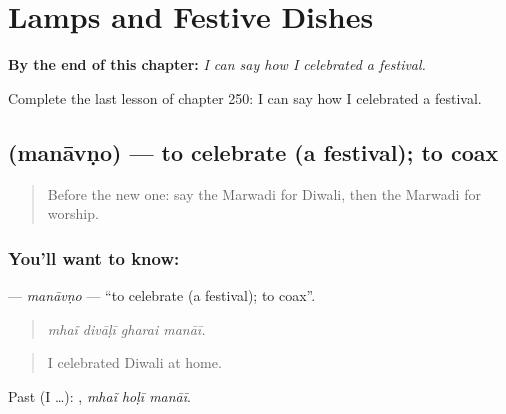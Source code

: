 
\chapter{Lamps and Festive Dishes}
\label{ch:mw-lamps-and-festive-dishes}

\begin{chapteropening}
\textbf{By the end of this chapter:} \emph{I can say how I celebrated a festival.}

Complete the last lesson of chapter 250: I can say how I celebrated a festival.
\end{chapteropening}

\section[\texorpdfstring{\mw{मनावणो} (manāvṇo)}{मनावणो (manāvṇo)}]{ (manāvṇo) — to celebrate (a festival); to coax}

\label{lesson:MW-C250-manavno}



\begin{quote}
Before the new one: say the Marwadi for Diwali, then the Marwadi for worship.
\end{quote}

\subsection*{You'll want to know: }
\textbf{} — \emph{manāvṇo} — \textquotedblleft{}to celebrate (a festival); to coax\textquotedblright{}.

\begin{quote}
   
\end{quote}

\begin{quote}
\emph{mhaĩ divāḷī gharai manāī.}
\end{quote}

\begin{quote}
I celebrated Diwali at home.
\end{quote}

Past (I …):   , \emph{mhaĩ hoḷī manāī}.

